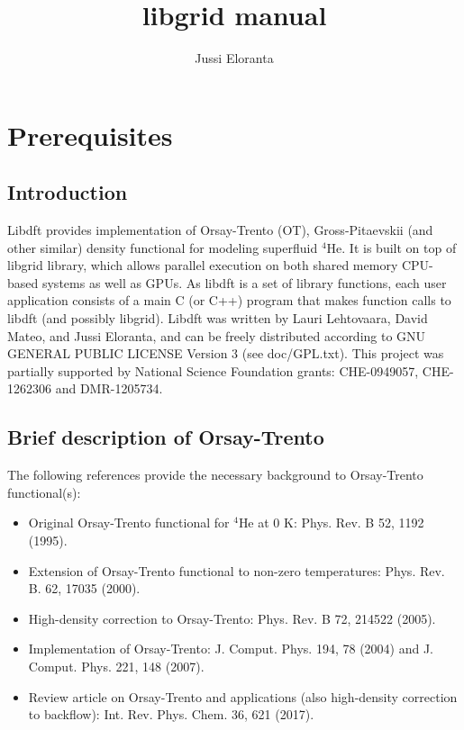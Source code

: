 \documentclass[12pt,letterpaper]{report}
\author{Jussi Eloranta}
\title{libgrid manual}
\begin{document}
\maketitle

\chapter{Prerequisites}

\section{Introduction}

Libdft provides implementation of Orsay-Trento (OT), Gross-Pitaevskii (and other 
similar) density functional for modeling superfluid $^4$He. It is built on top 
of libgrid library, which allows parallel execution on both shared memory 
CPU-based systems as well as GPUs. As libdft is a set of library functions,
each user application consists of a main C (or C++) program that makes
function calls to libdft (and possibly libgrid). 
Libdft was written by Lauri Lehtovaara, David Mateo, and Jussi Eloranta, and 
can be freely distributed according to GNU GENERAL PUBLIC LICENSE Version 3 
(see doc/GPL.txt). This project was partially supported by National Science 
Foundation grants: CHE-0949057, CHE-1262306 and DMR-1205734.

\section{Brief description of Orsay-Trento}

The following references provide the necessary background to Orsay-Trento functional(s):
\begin{itemize}
\item Original Orsay-Trento functional for $^4$He at 0 K: Phys. Rev. B 52, 1192 (1995).
\item Extension of Orsay-Trento functional to non-zero temperatures: Phys. Rev. B. 62, 17035 (2000).
\item High-density correction to Orsay-Trento: Phys. Rev. B 72, 214522 (2005).
\item Implementation of Orsay-Trento: J. Comput. Phys. 194, 78 (2004) and J. Comput. Phys. 221, 148 (2007).
\item Review article on Orsay-Trento and applications (also high-density correction to backflow): Int. Rev. Phys. Chem. 36, 621 (2017).
\end{itemize}
\end{document}
